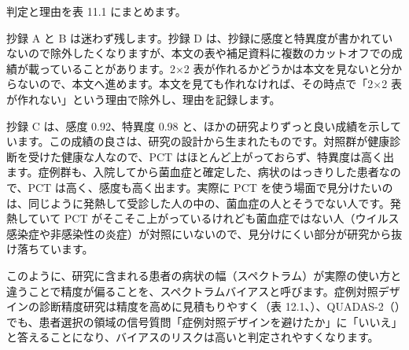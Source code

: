 判定と理由を表 11.1 にまとめます。

\begin{kkcenter}
\end{kkcenter}

抄録 A と B は迷わず残します。抄録 D は、抄録に感度と特異度が書かれていないので除外したくなりますが、本文の表や補足資料に複数のカットオフでの成績が載っていることがあります。2×2 表が作れるかどうかは本文を見ないと分からないので、本文へ進めます。本文を見ても作れなければ、その時点で「2×2 表が作れない」という理由で除外し、理由を記録します。

抄録 C は、感度 0.92、特異度 0.98 と、ほかの研究よりずっと良い成績を示しています。この成績の良さは、研究の設計から生まれたものです。対照群が健康診断を受けた健康な人なので、PCT はほとんど上がっておらず、特異度は高く出ます。症例群も、入院してから菌血症と確定した、病状のはっきりした患者なので、PCT は高く、感度も高く出ます。実際に PCT を使う場面で見分けたいのは、同じように発熱して受診した人の中の、菌血症の人とそうでない人です。発熱していて PCT がそこそこ上がっているけれども菌血症ではない人（ウイルス感染症や非感染性の炎症）が対照にいないので、見分けにくい部分が研究から抜け落ちています。

このように、研究に含まれる患者の病状の幅（スペクトラム）が実際の使い方と違うことで精度が偏ることを、スペクトラムバイアスと呼びます。症例対照デザインの診断精度研究は精度を高めに見積もりやすく（表 12.1、）、QUADAS-2（）でも、患者選択の領域の信号質問「症例対照デザインを避けたか」に「いいえ」と答えることになり、バイアスのリスクは高いと判定されやすくなります。

